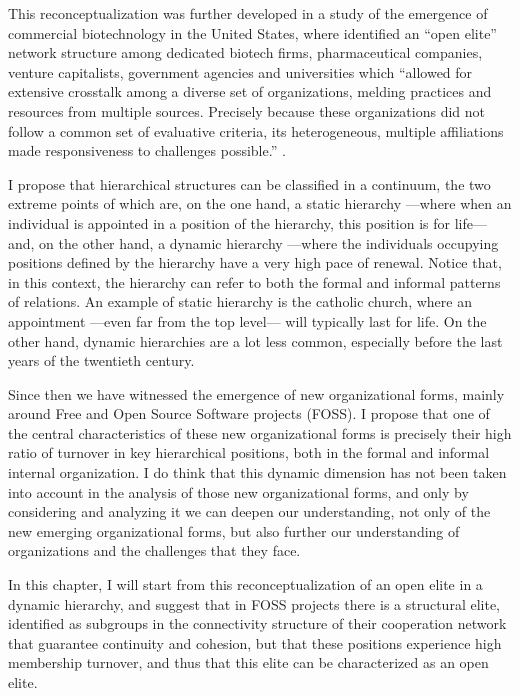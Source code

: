 This reconceptualization was further developed in a study of the emergence of commercial biotechnology in the United States, where \citet{powell:2005} identified an ``open elite'' network structure among dedicated biotech firms, pharmaceutical companies, venture capitalists, government agencies and universities which ``allowed for extensive crosstalk among a diverse set of organizations, melding practices and resources from multiple sources. Precisely because these organizations did not follow a common set of evaluative criteria, its heterogeneous, multiple affiliations made responsiveness to challenges possible.'' \citet[467]{powell:2005}.

I propose that hierarchical structures can be classified in a continuum, the two extreme points of which are, on the one hand, a static hierarchy ---where when an individual is appointed in a position of the hierarchy, this position is for life--- and, on the other hand, a dynamic hierarchy ---where the individuals occupying positions defined by the hierarchy have a very high pace of renewal. Notice that, in this context, the hierarchy can refer to both the formal and informal patterns of relations. An example of static hierarchy is the catholic church, where an appointment ---even far from the top level--- will typically last for life. On the other hand, dynamic hierarchies are a lot less common, especially before the last years of the twentieth century.

Since then we have witnessed the emergence of new organizational forms, mainly around Free and Open Source Software projects (FOSS). I propose that one of the central characteristics of these new organizational forms is precisely their high ratio of turnover in key hierarchical positions, both in the formal and informal internal organization. I do think that this dynamic dimension has not been taken into account in the analysis of those new organizational forms, and only by considering and analyzing it we can deepen our understanding, not only of the new emerging organizational forms, but also further our understanding of organizations and the challenges that they face.

In this chapter, I will start from this reconceptualization of an open elite in a dynamic hierarchy, and suggest that in FOSS projects there is a structural elite, identified as subgroups in the connectivity structure of their cooperation network that guarantee continuity and cohesion, but that these positions experience high membership turnover, and thus that this elite can be characterized as an open elite.

